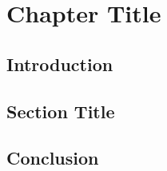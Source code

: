 \chapter{Chapter Title}
 
\section{Introduction}
 
\section{Section Title}
 
 
\section{Conclusion}
